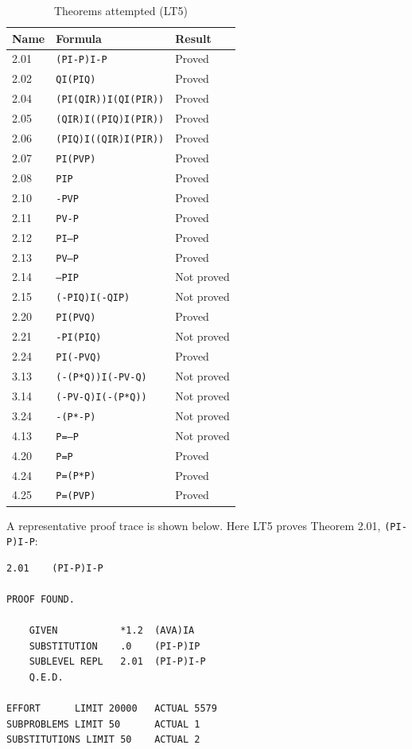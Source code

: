 \documentclass[journal]{IEEEtran}
\begin{document}
\begin{table}[h]
\centering
\caption{Theorems attempted (LT5)}
\label{tab:results}
\begin{tabular}{lll}
\toprule
\textbf{Name} & \textbf{Formula} & \textbf{Result} \\
\midrule
2.01 & \texttt{(PI-P)I-P} & Proved \\
2.02 & \texttt{QI(PIQ)} & Proved \\
2.04 & \texttt{(PI(QIR))I(QI(PIR))} & Proved \\
2.05 & \texttt{(QIR)I((PIQ)I(PIR))} & Proved \\
2.06 & \texttt{(PIQ)I((QIR)I(PIR))} & Proved \\
2.07 & \texttt{PI(PVP)} & Proved \\
2.08 & \texttt{PIP} & Proved \\
2.10 & \texttt{-PVP} & Proved \\
2.11 & \texttt{PV-P} & Proved \\
2.12 & \texttt{PI--P} & Proved \\
2.13 & \texttt{PV---P} & Proved \\
2.14 & \texttt{--PIP} & Not proved \\
2.15 & \texttt{(-PIQ)I(-QIP)} & Not proved \\
2.20 & \texttt{PI(PVQ)} & Proved \\
2.21 & \texttt{-PI(PIQ)} & Not proved \\
2.24 & \texttt{PI(-PVQ)} & Proved \\
3.13 & \texttt{(-(P*Q))I(-PV-Q)} & Not proved \\
3.14 & \texttt{(-PV-Q)I(-(P*Q))} & Not proved \\
3.24 & \texttt{-(P*-P)} & Not proved \\
4.13 & \texttt{P=--P} & Not proved \\
4.20 & \texttt{P=P} & Proved \\
4.24 & \texttt{P=(P*P)} & Proved \\
4.25 & \texttt{P=(PVP)} & Proved \\
\bottomrule
\end{tabular}
\end{table}

A representative proof trace is shown below. Here LT5 proves Theorem
2.01, \texttt{(PI-P)I-P}:

\begin{lstlisting}
2.01    (PI-P)I-P

PROOF FOUND.

    GIVEN           *1.2  (AVA)IA
    SUBSTITUTION    .0    (PI-P)IP
    SUBLEVEL REPL   2.01  (PI-P)I-P
    Q.E.D.

EFFORT      LIMIT 20000   ACTUAL 5579
SUBPROBLEMS LIMIT 50      ACTUAL 1
SUBSTITUTIONS LIMIT 50    ACTUAL 2
\end{lstlisting}
\end{document}
